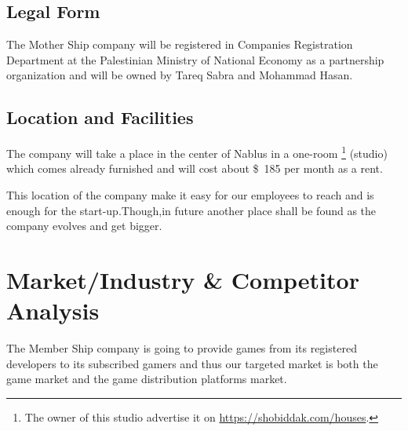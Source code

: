 \documentclass[fontsize=14pt,svgnames]{scrreprt}
\begin{document}
\section{Legal Form}
The Mother Ship company will be registered in Companies Registration Department at the Palestinian Ministry of National Economy as a partnership organization and will be owned by Tareq Sabra and Mohammad Hasan.
\section{Location and Facilities}
\par The company will take a place in the center of Nablus in a one-room \footnote{The  owner of this studio advertise it on \url{https://shobiddak.com/houses}.} (studio) which comes already furnished and will cost about \SI{185}[\$]{} per month as a rent.   
\par This location of the company make it easy for our employees to reach and is enough for the start-up.Though,in future another place shall be found as the company evolves and get bigger. 
\chapter{Market/Industry \& Competitor Analysis}
The Member Ship company is going to provide games from its registered developers to its subscribed gamers and thus our targeted market is both the game
market and the game distribution platforms market.
\end{document}
